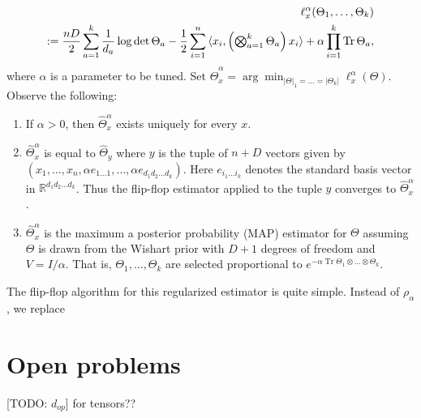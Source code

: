 \documentclass{article}
\newcommand{\R}{{\mathbb{R}}}
\newcommand{\ot}{\otimes}
\newcommand\samp{x}
\newcommand\tr{\operatorname{Tr}}
\newcommand{\TODO}[1]{{\color{blue}[TODO: #1]}}
\begin{document}
\begin{align*}
  \ell_{\samp}^\alpha(\Theta_1, \dots, \Theta_k)\\
  := \frac {n D} 2 \sum_{a = 1}^k \frac{1}{d_a} \log \det \Theta_a  - \frac12 \sum_{i=1}^n \braket{\samp_i, \left( \textstyle \bigotimes_{a=1}^k \Theta_a \right) \samp_i} + \alpha \prod_{i=1}^k \tr \Theta_a,
\end{align*} 
where $\alpha$ is a parameter to be tuned. Set $\widehat{\Theta}^\alpha_x = \arg\min_{|\Theta|_1 =\dots =  |\Theta_k|} \ell^\alpha_\samp(\Theta)$. 
Observe the following:
\begin{enumerate}
\item If $\alpha > 0$, then $\widehat{\Theta}^\alpha_x$ exists uniquely for every $x$.
\item $\widehat{\Theta}^\alpha_x$ is equal to $\widehat{\Theta}_{y}$ where $y$ is the tuple of $n + D$ vectors given by $(x_1, \dots, x_n, \alpha e_{1\dots 1}, \dots, \alpha e_{d_1d_2 \dots d_k})$. Here $e_{i_1 \dots i_k}$ denotes the standard basis vector in $\R^{d_1d_2 \dots d_k}$. Thus the flip-flop estimator applied to the tuple $y$ converges to $\widehat{\Theta}^\alpha_x$.
\item $\widehat{\Theta}^\alpha_x$ is the maximum a posterior probability (MAP) estimator for $\Theta$ assuming $\Theta$ is drawn from the Wishart prior with $D + 1$ degrees of freedom and $V = I/\alpha$. That is, $\Theta_1, \dots, \Theta_k$ are selected proportional to $e^{- \alpha \tr \Theta_1 \ot \dots \ot \Theta_k}.$ 
\end{enumerate}


The flip-flop algorithm for this regularized estimator is quite simple. Instead of $\rho_\alpha$, we replace 



\section{Open problems}
\TODO{$d_{op}$} for tensors??








\appendix


\end{document}
